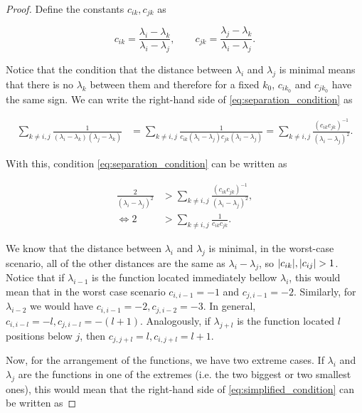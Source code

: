 \begin{proof}
    Define the constants $c_{ik}, c_{jk}$ as 

    \begin{equation*}
        c_{ik} = \frac{\lambda_i - \lambda_k}{\lambda_i - \lambda_j}, \qquad c_{jk} = \frac{\lambda_j - \lambda_k}{\lambda_i - \lambda_j}.
    \end{equation*}

    Notice that the condition that the distance between $\lambda_i$ and $\lambda_j$ is minimal means that there is no $\lambda_k$ between them and therefore for a fixed $k_0$, $c_{ik_0}$ and $c_{jk_0}$ have the same sign. We can write the right-hand side of \eqref{eq:separation_condition} as

    \begin{align*}
        \sum_{k\neq i,j} \frac{1}{(\lambda_i - \lambda_k)(\lambda_j - \lambda_k)} &= \sum_{k\neq i,j} \frac{1}{ c_{ik}(\lambda_i - \lambda_j) c_{jk}(\lambda_i - \lambda_j)} = \sum_{k\neq i,j} \frac{ (c_{ik}c_{jk})^{-1} }{(\lambda_i-\lambda_j)^2}.
    \end{align*}

    With this, condition \eqref{eq:separation_condition} can be written as

    \begin{align}
        \frac{2}{(\lambda_i - \lambda_j)^2} &> \sum_{k\neq i,j} \frac{ (c_{ik}c_{jk})^{-1} }{(\lambda_i-\lambda_j)^2},\\
        \Leftrightarrow 2 &> \sum_{k\neq i,j} \frac{1}{c_{ik}c_{jk}}. \label{eq:simplified_condition}
    \end{align}

    We know that the distance between $\lambda_i$ and $\lambda_j$ is minimal, in the worst-case scenario, all of the other distances are the same as $\lambda_i - \lambda_j$, so $\lvert c_{ik} \rvert,\lvert c_{ij} \rvert>1$. Notice that if $\lambda_{i-1}$ is the function located immediately bellow $\lambda_i$, this would mean that in the worst case scenario $c_{i,i-1}=-1$ and $c_{j,i-1} = -2$. Similarly, for $\lambda_{i-2}$ we would have $c_{i,i-1} = -2, c_{j,i-2} =-3$. In general, $c_{i,i-l} = -l, c_{j,i-l} = -(l+1)$. Analogously, if $\lambda_{j+l}$ is the function located $l$ positions below $j$, then $c_{j,j+l} = l, c_{i,j+l} = l+1$.

    Now, for the arrangement of the functions, we have two extreme cases. If $\lambda_i$ and $\lambda_j$ are the functions in one of the extremes (i.e. the two biggest or two smallest ones), this would mean that the right-hand side of \eqref{eq:simplified_condition} can be written as


\end{proof}
